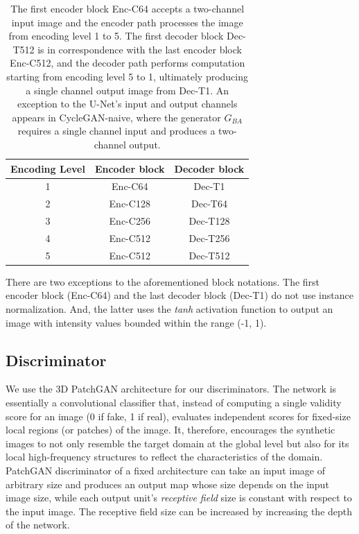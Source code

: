 \begin{table}[h!]
    \centering
    \begin{tabular}{|c|c|c|}
        \hline
        \textbf{Encoding Level} & \textbf{Encoder block} & \textbf{Decoder block} \\
        \hline
        1     & Enc-C64          & Dec-T1           \\
        \hline
        2     & Enc-C128         & Dec-T64          \\
        \hline
        3     & Enc-C256         & Dec-T128         \\
        \hline
        4     & Enc-C512         & Dec-T256         \\
        \hline
        5     & Enc-C512         & Dec-T512         \\
        \hline
    \end{tabular}
    \caption{The first encoder block Enc-C64 accepts a two-channel input image and the encoder path processes the image from encoding level 1 to 5. The first decoder block Dec-T512 is in correspondence with the last encoder block Enc-C512, and the decoder path performs computation starting from encoding level 5 to 1, ultimately producing a single channel output image from Dec-T1. An exception to the U-Net's input and output channels appears in CycleGAN-naive, where the generator $G_{BA}$ requires a single channel input and produces a two-channel output.}
    \label{tab:generator_architecture}
\end{table}

There are two exceptions to the aforementioned block notations. The first encoder block (Enc-C64) and the last decoder block (Dec-T1) do not use instance normalization. And, the latter uses the \textit{tanh} activation function to output an image with intensity values bounded within the range (-1, 1). 


\subsection{Discriminator}
We use the 3D PatchGAN architecture for our discriminators. The network is essentially a convolutional classifier that, instead of computing a single validity score for an image (0 if fake, 1 if real), evaluates independent scores for fixed-size local regions (or patches) of the image. It, therefore, encourages the synthetic images to not only resemble the target domain at the global level but also for its local high-frequency structures to reflect the characteristics of the domain. PatchGAN discriminator of a fixed architecture can take an input image of arbitrary size and produces an output map whose size depends on the input image size, while each output unit's \textit{receptive field} size is constant with respect to the input image. The receptive field size can be increased by increasing the depth of the network.

